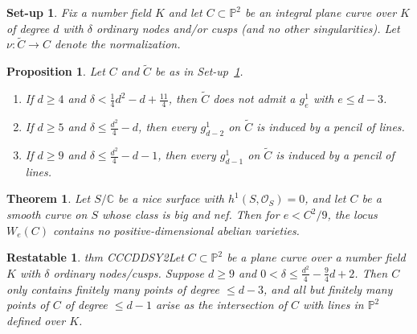 \documentclass[10pt,a4paper]{amsart}
\newtheorem{restatable}{Restatable}
\newtheorem{setup}{Set-up}
\newtheorem{proposition}{Proposition}
\newtheorem{thm}{Theorem}
\newcommand{\C}{\mathbb{C}}
\renewcommand{\O}{\mathcal{O}}
\renewcommand{\P}{\mathbb{P}}
\newcommand{\tC}{\widetilde{C}}
\begin{document}
\begin{setup}\label{Setup}
    Fix a number field $K$ and let $C \subset \P^{2}$ be an integral plane curve over $K$ of degree $d$ with $\delta$ ordinary nodes and/or cusps (and no other singularities). Let $\nu \colon \tC \rightarrow C$ denote the normalization.
\end{setup}

\begin{proposition}\label{prop:corollaryOfCK}
    Let $C$ and $\tC$ be as in Set-up~\ref{Setup}.
    \begin{enumerate}[topsep=-1ex, itemsep=-0.5ex, partopsep=1ex, parsep=1ex]
        \item[(i)]\label{prop:corollaryOfCK-1} If $d \geq 4$ and $\delta < \frac{1}{4} d^{2} - d + \frac{11}{4}$, then $\tC$ does not admit a $g^{1}_{e}$ with $e \leq d-3$.
        \item[(ii)]\label{prop:corollaryOfCK-2} If $d \geq 5$ and $\delta \leq \frac{d^{2}}{4} - d$, then every $g^{1}_{d-2}$ on $\tC$ is induced by a pencil of lines.
        \item[(iii)]\label{prop:corollaryOfCK-3} If $d \geq 9$ and $\delta \leq \frac{d^{2}}{4} - d - 1$, then every $g^{1}_{d-1}$ on $\tC$ is induced by a pencil of lines.
    \end{enumerate}
\end{proposition}

\begin{thm}\label{thm: main_geometric}
Let $S/\C$ be a nice surface with $h^1(S, \O_S)=0$, and let $C$ be a smooth curve on $S$ whose class is big and nef. Then for $e < C^2/9$, the locus $W_e(C)$ contains no positive-dimensional abelian varieties.
\end{thm}

\begin{restatable}{thm} {CCCDDSY2}\label{thm:CCCDDSY2} Let $C \subset \P^{2}$ be a plane curve over a number field $K$ with $\delta$ ordinary nodes/cusps. Suppose $d \geq 9$ and $0<\delta \leq \frac{d^2}{4}-\frac{9}{4}d+2$.
Then $C$ only contains finitely many points of degree $\leq d-3$, and all but finitely many points of $C$ of degree $\leq d-1$ arise as the intersection of $C$ with lines in $\P^2$ defined over $K$.
\end{restatable}
\end{document}
